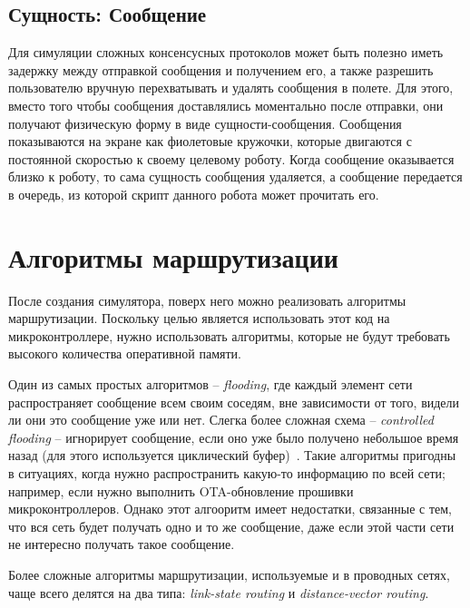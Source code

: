 \documentclass[%
]{article}
\begin{document}
\subsection{Сущность: Сообщение}

Для симуляции сложных консенсусных протоколов
может быть полезно иметь задержку между отправкой сообщения
и получением его,
а также разрешить пользователю вручную перехватывать и удалять сообщения в полете.
Для этого, вместо того чтобы сообщения доставлялись моментально после отправки,
они получают физическую форму в виде сущности-сообщения.
Сообщения показываются на экране как фиолетовые кружочки,
которые двигаются с постоянной скоростью к своему целевому роботу.
Когда сообщение оказывается близко к роботу,
то сама сущность сообщения удаляется,
а сообщение передается в очередь,
из которой скрипт данного робота может прочитать его.

\section{Алгоритмы маршрутизации}

После создания симулятора,
поверх него можно реализовать алгоритмы маршрутизации.
Поскольку целью является использовать этот код на микроконтроллере,
нужно использовать алгоритмы, которые не будут требовать высокого
количества оперативной памяти.

Один из самых простых алгоритмов -- \emph{flooding},
где каждый элемент сети распространяет сообщение
всем своим соседям, вне зависимости от того, видели ли они это сообщение уже или нет.
Слегка более сложная схема -- \emph{controlled flooding} -- игнорирует сообщение,
если оно уже было получено небольшое время назад (для этого
используется циклический буфер)~\cite{rahman2004controlled}.
Такие алгоритмы пригодны в ситуациях,
когда нужно распространить какую-то информацию по всей сети;
например, если нужно выполнить OTA-обновление прошивки микроконтроллеров.
Однако этот алгооритм имеет недостатки,
связанные с тем, что вся сеть будет получать одно и то же сообщение,
даже если этой части сети не интересно получать такое сообщение.

Более сложные алгоритмы маршрутизации,
используемые и в проводных сетях,
чаще всего делятся на два типа:
\emph{link-state routing} и \emph{distance-vector routing}.
\end{document}
